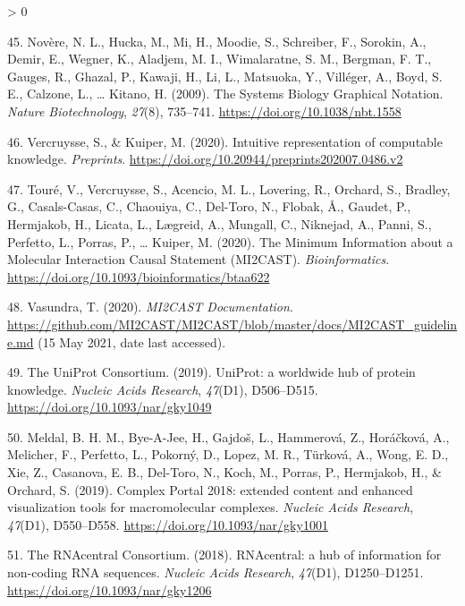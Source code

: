 \documentclass[
  12pt,
]{book}
\newlength{\cslhangindent}
\newenvironment{CSLReferences}[2] %
 {%
  \setlength{\parindent}{0pt}
  \ifodd #1 \everypar{\setlength{\hangindent}{\cslhangindent}}\ignorespaces\fi
  \ifnum #2 > 0
  \setlength{\parskip}{#2\baselineskip}
  \fi
 }%
 {}
\begin{document}
\begin{CSLReferences}{1}{0}
\leavevmode\hypertarget{ref-Novere2009}{}%
45. Novère, N. L., Hucka, M., Mi, H., Moodie, S., Schreiber, F., Sorokin, A., Demir, E., Wegner, K., Aladjem, M. I., Wimalaratne, S. M., Bergman, F. T., Gauges, R., Ghazal, P., Kawaji, H., Li, L., Matsuoka, Y., Villéger, A., Boyd, S. E., Calzone, L., \ldots{} Kitano, H. (2009). {The Systems Biology Graphical Notation}. \emph{Nature Biotechnology}, \emph{27}(8), 735--741. \url{https://doi.org/10.1038/nbt.1558}

\leavevmode\hypertarget{ref-vsm-paper}{}%
46. Vercruysse, S., \& Kuiper, M. (2020). {Intuitive representation of computable knowledge}. \emph{Preprints}. \url{https://doi.org/10.20944/preprints202007.0486.v2}

\leavevmode\hypertarget{ref-Toure2020}{}%
47. Touré, V., Vercruysse, S., Acencio, M. L., Lovering, R., Orchard, S., Bradley, G., Casals-Casas, C., Chaouiya, C., Del-Toro, N., Flobak, Å., Gaudet, P., Hermjakob, H., Licata, L., Lægreid, A., Mungall, C., Niknejad, A., Panni, S., Perfetto, L., Porras, P., \ldots{} Kuiper, M. (2020). {The Minimum Information about a Molecular Interaction Causal Statement (MI2CAST)}. \emph{Bioinformatics}. \url{https://doi.org/10.1093/bioinformatics/btaa622}

\leavevmode\hypertarget{ref-mi2cast-doc}{}%
48. Vasundra, T. (2020). \emph{{MI2CAST Documentation}}. \url{https://github.com/MI2CAST/MI2CAST/blob/master/docs/MI2CAST_guideline.md} (15 May 2021, date last accessed).

\leavevmode\hypertarget{ref-TheUniProtConsortium2019}{}%
49. The UniProt Consortium. (2019). {UniProt: a worldwide hub of protein knowledge}. \emph{Nucleic Acids Research}, \emph{47}(D1), D506--D515. \url{https://doi.org/10.1093/nar/gky1049}

\leavevmode\hypertarget{ref-Meldal2019}{}%
50. Meldal, B. H. M., Bye-A-Jee, H., Gajdoš, L., Hammerová, Z., Horáčková, A., Melicher, F., Perfetto, L., Pokorný, D., Lopez, M. R., Türková, A., Wong, E. D., Xie, Z., Casanova, E. B., Del-Toro, N., Koch, M., Porras, P., Hermjakob, H., \& Orchard, S. (2019). {Complex Portal 2018: extended content and enhanced visualization tools for macromolecular complexes}. \emph{Nucleic Acids Research}, \emph{47}(D1), D550--D558. \url{https://doi.org/10.1093/nar/gky1001}

\leavevmode\hypertarget{ref-RNACentral2018}{}%
51. The RNAcentral Consortium. (2018). {RNAcentral: a hub of information for non-coding RNA sequences}. \emph{Nucleic Acids Research}, \emph{47}(D1), D1250--D1251. \url{https://doi.org/10.1093/nar/gky1206}


\end{CSLReferences}
\end{document}
